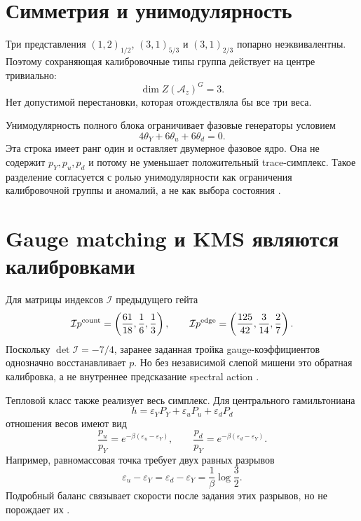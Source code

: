 \section{Симметрия и унимодулярность}

Три представления $(1,2)_{1/2}$, $(3,1)_{5/3}$ и $(3,1)_{2/3}$ попарно
неэквивалентны. Поэтому сохраняющая калибровочные типы группа действует на
центре тривиально:
\begin{equation}
 \dim Z(\mathcal A_z)^G=3.
 \label{eq:v8-extra-edge-simplex-fixed-center}
\end{equation}
Нет допустимой перестановки, которая отождествляла бы все три веса.

Унимодулярность полного блока ограничивает фазовые генераторы условием
\begin{equation}
 4\theta_Y+6\theta_u+6\theta_d=0.
 \label{eq:v8-extra-edge-simplex-unimodularity}
\end{equation}
Эта строка имеет ранг один и оставляет двумерное фазовое ядро. Она не
содержит $p_Y,p_u,p_d$ и потому не уменьшает положительный trace-симплекс.
Такое разделение согласуется с ролью унимодулярности как ограничения
калибровочной группы и аномалий, а не как выбора состояния
\cite{v8-extra-edge-simplex-unimodularity-source}.

\section{Gauge matching и KMS являются калибровками}

Для матрицы индексов $\mathcal I$ предыдущего гейта
\begin{equation}
 \mathcal I p^{\rm count}
 =\left(\frac{61}{18},\frac16,\frac13\right),\qquad
 \mathcal I p^{\rm edge}
 =\left(\frac{125}{42},\frac3{14},\frac27\right).
 \label{eq:v8-extra-edge-simplex-gauge-images}
\end{equation}
Поскольку $\det\mathcal I=-7/4$, заранее заданная тройка gauge-коэффициентов
однозначно восстанавливает $p$. Но без независимой слепой мишени это
обратная калибровка, а не внутреннее предсказание spectral action
\cite{v8-extra-edge-simplex-spectral-action}.

Тепловой класс также реализует весь симплекс. Для центрального
гамильтониана
\begin{equation}
 h=\varepsilon_YP_Y+\varepsilon_uP_u+\varepsilon_dP_d
 \label{eq:v8-extra-edge-simplex-central-hamiltonian}
\end{equation}
отношения весов имеют вид
\begin{equation}
 \frac{p_u}{p_Y}=e^{-\beta(\varepsilon_u-\varepsilon_Y)},\qquad
 \frac{p_d}{p_Y}=e^{-\beta(\varepsilon_d-\varepsilon_Y)}.
 \label{eq:v8-extra-edge-simplex-gibbs-parameterization}
\end{equation}
Например, равномассовая точка требует двух равных разрывов
\begin{equation}
 \varepsilon_u-\varepsilon_Y
 =\varepsilon_d-\varepsilon_Y
 =\frac1\beta\log\frac32.
 \label{eq:v8-extra-edge-simplex-equal-mass-gaps}
\end{equation}
Подробный баланс связывает скорости после задания этих разрывов, но не
порождает их \cite{v8-extra-edge-simplex-detailed-balance}.


